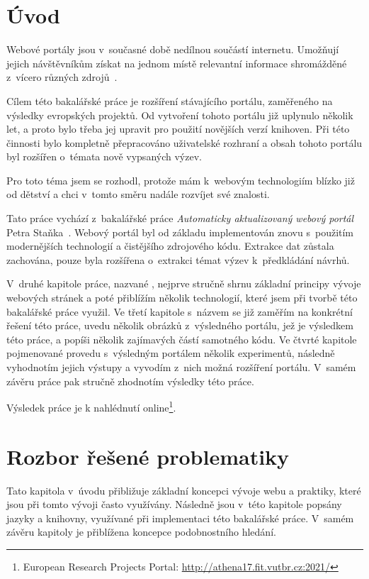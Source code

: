 \chapter{Úvod}
Webové portály jsou v~současné době nedílnou součástí internetu. Umožňují jejich návštěvníkům získat na jednom místě relevantní informace shromážděné z~vícero různých zdrojů~\cite{bib:portal-liferay}.

Cílem této bakalářské práce je rozšíření stávajícího portálu, zaměřeného na výsledky evropských projektů. Od vytvoření tohoto portálu již uplynulo několik let, a proto bylo třeba jej upravit pro použití novějších verzí knihoven. Při této činnosti bylo kompletně přepracováno uživatelské rozhraní a obsah tohoto portálu byl rozšířen o~témata nově vypsaných výzev.

Pro toto téma jsem se rozhodl, protože mám k~webovým technologiím blízko již od dětství a chci v~tomto směru nadále rozvíjet své znalosti.

Tato práce vychází z~bakalářské práce \emph{Automaticky aktualizovaný webový portál} Petra Staňka~\cite{bib:stanek}.
Webový portál byl od základu implementován znovu s~použitím modernějších technologií a čistějšího zdrojového kódu. Extrakce dat zůstala zachována, pouze byla rozšířena o~extrakci témat výzev k~předkládání návrhů.

V~druhé kapitole práce, nazvané , nejprve stručně shrnu základní principy vývoje webových stránek a poté přiblížím několik technologií, které jsem při tvorbě této bakalářské práce využil.
Ve třetí kapitole s~názvem  se již zaměřím na konkrétní řešení této práce, uvedu několik obrázků z~výsledného portálu, jež je výsledkem této práce, a popíši několik zajímavých částí samotného kódu.
Ve čtvrté kapitole pojmenované  provedu s~výsledným portálem několik experimentů, následně vyhodnotím jejich výstupy a vyvodím z~nich možná rozšíření portálu.
V~samém závěru práce pak stručně zhodnotím výsledky této práce.

Výsledek práce je k nahlédnutí online\footnote{European Research Projects Portal: \url{http://athena17.fit.vutbr.cz:2021/}}.




\chapter{Rozbor řešené problematiky}
Tato kapitola v~úvodu přibližuje základní koncepci vývoje webu a praktiky, které jsou při tomto vývoji často využívány. Následně jsou v~této kapitole popsány jazyky a knihovny, využívané při implementaci této bakalářské práce. V~samém závěru kapitoly je přiblížena koncepce podobnostního hledání.



